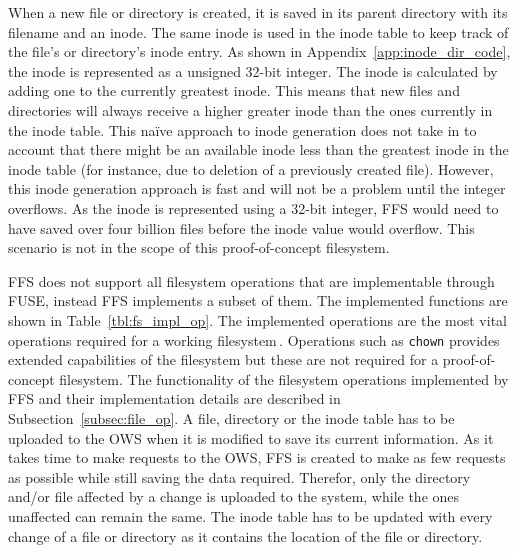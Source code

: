 When a new file or directory is created, it is saved in its parent directory with its filename and an inode. The same inode is used in the inode table to keep track of the file's or directory's inode entry. As shown in Appendix~\ref{app:inode_dir_code}, the inode is represented as a unsigned 32-bit integer. The inode is calculated by adding one to the currently greatest inode. This means that new files and directories will always receive a higher greater inode than the ones currently in the inode table. This naïve approach to inode generation does not take in to account that there might be an available inode less than the greatest inode in the inode table (for instance, due to deletion of a previously created file). However, this inode generation approach is fast and will not be a problem until the integer overflows. As the inode is represented using a 32-bit integer, FFS would need to have saved over four billion files before the inode value would overflow. This scenario is not in the scope of this proof-of-concept filesystem.

FFS does not support all filesystem operations that are implementable through FUSE, instead FFS implements a subset of them. The implemented functions are shown in Table~\ref{tbl:fs_impl_op}. The implemented operations are the most vital operations required for a working filesystem\,\cite{kuenningCS135FUSEDocumentation2010}. Operations such as \texttt{chown} provides extended capabilities of the filesystem but these are not required for a proof-of-concept filesystem. The functionality of the filesystem operations implemented by FFS and their implementation details are described in Subsection~\ref{subsec:file_op}. A file, directory or the inode table has to be uploaded to the OWS when it is modified to save its current information. As it takes time to make requests to the OWS, FFS is created to make as few requests as possible while still saving the data required. Therefor, only the directory and/or file affected by a change is uploaded to the system, while the ones unaffected can remain the same. The inode table has to be updated with every change of a file or directory as it contains the location of the file or directory.

